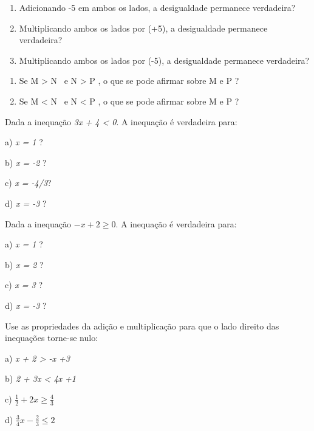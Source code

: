 \begin{exercicios}

\begin{enumerate}
	\item Adicionando -5 em ambos os lados, a desigualdade permanece verdadeira?

	\item Multiplicando ambos os lados por (+5), a desigualdade permanece verdadeira?

	\item Multiplicando ambos os lados por (-5), a desigualdade permanece verdadeira?
\end{enumerate}


\begin{enumerate}
	\item Se M > N~ e N > P , o que se pode afirmar sobre M e P ?

	\item Se M < N~ e N < P , o que se pode afirmar sobre M e P ?
\end{enumerate}


    \exitem{} Dada a inequação \textit{3x + 4 < 0}. A inequação é verdadeira para:

    a) \textit{x = 1} ?
    
    b) \textit{x = -2} ?
    
    c) \textit{x = -4/3}?
    
    d) \textit{x = -3} ?

	\exitem{} Dada a inequação $-x + 2 \geq 0 $. A inequação é verdadeira para:

    a) \textit{x = 1} ?
    
    b) \textit{x = 2} ?
    
    c) \textit{x = 3} ?
    
    d) \textit{x = -3} ?

	\exitem{} Use as propriedades da adição e multiplicação para que o lado direito das inequações torne-se nulo: 

	a) \textit{x + 2 > -x +3}

	b) \textit{2 + 3x < 4x +1}
    
    c) \( \frac{1}{2}+2x \geq \frac{4}{3} \)

    d) \( \frac{3}{4}x-\frac{2}{3} \leq 2 \)


\end{exercicios}
